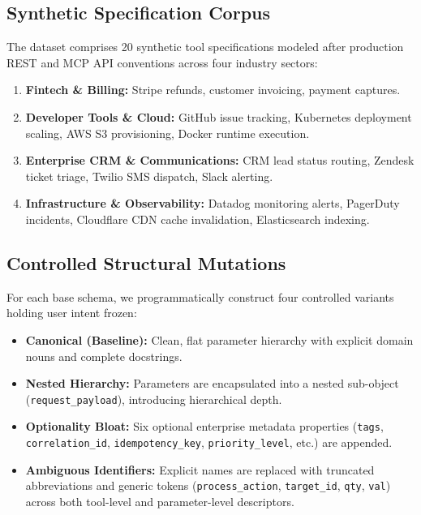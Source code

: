 \documentclass[10pt,conference]{IEEEtran}
\begin{document}
\subsection{Synthetic Specification Corpus}
The dataset comprises 20 synthetic tool specifications modeled after production REST and MCP API conventions across four industry sectors:
\begin{enumerate}
    \item \textbf{Fintech \& Billing:} Stripe refunds, customer invoicing, payment captures.
    \item \textbf{Developer Tools \& Cloud:} GitHub issue tracking, Kubernetes deployment scaling, AWS S3 provisioning, Docker runtime execution.
    \item \textbf{Enterprise CRM \& Communications:} CRM lead status routing, Zendesk ticket triage, Twilio SMS dispatch, Slack alerting.
    \item \textbf{Infrastructure \& Observability:} Datadog monitoring alerts, PagerDuty incidents, Cloudflare CDN cache invalidation, Elasticsearch indexing.
\end{enumerate}

\subsection{Controlled Structural Mutations}
For each base schema, we programmatically construct four controlled variants holding user intent frozen:
\begin{itemize}
    \item \textbf{Canonical (Baseline):} Clean, flat parameter hierarchy with explicit domain nouns and complete docstrings.
    \item \textbf{Nested Hierarchy:} Parameters are encapsulated into a nested sub-object (\texttt{request\_payload}), introducing hierarchical depth.
    \item \textbf{Optionality Bloat:} Six optional enterprise metadata properties (\texttt{tags}, \texttt{correlation\_id}, \texttt{idempotency\_key}, \texttt{priority\_level}, etc.) are appended.
    \item \textbf{Ambiguous Identifiers:} Explicit names are replaced with truncated abbreviations and generic tokens (\texttt{process\_action}, \texttt{target\_id}, \texttt{qty}, \texttt{val}) across both tool-level and parameter-level descriptors.
\end{itemize}
\end{document}
